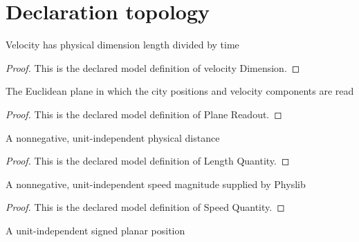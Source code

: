 \section{Declaration topology}
\begin{definition}
  \label{def:physics:phyx-mini-0828:phyxminiproblems-problemphyxmini0828-velocitydimension}
  Velocity has physical dimension length divided by time
\end{definition}
\begin{proof}
  This is the declared model definition of velocity Dimension.
\end{proof}
\begin{definition}
  \label{def:physics:phyx-mini-0828:phyxminiproblems-problemphyxmini0828-planereadout}
  The Euclidean plane in which the city positions and velocity components are read
\end{definition}
\begin{proof}
  This is the declared model definition of Plane Readout.
\end{proof}
\begin{definition}
  \label{def:physics:phyx-mini-0828:phyxminiproblems-problemphyxmini0828-lengthquantity}
  A nonnegative, unit-independent physical distance
\end{definition}
\begin{proof}
  This is the declared model definition of Length Quantity.
\end{proof}
\begin{definition}
  \label{def:physics:phyx-mini-0828:phyxminiproblems-problemphyxmini0828-speedquantity}
  A nonnegative, unit-independent speed magnitude supplied by Physlib
\end{definition}
\begin{proof}
  This is the declared model definition of Speed Quantity.
\end{proof}
\begin{definition}
  \label{def:physics:phyx-mini-0828:phyxminiproblems-problemphyxmini0828-planarpositionquantity}
  A unit-independent signed planar position
\end{definition}
